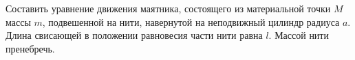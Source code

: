 Составить уравнение движения маятника,
состоящего из материальной точки $M$ массы $m$,
подвешенной на нити, навернутой на неподвижный цилиндр радиуса $a$.
Длина свисающей в положении равновесия части нити равна $l$.
Массой нити пренебречь.
